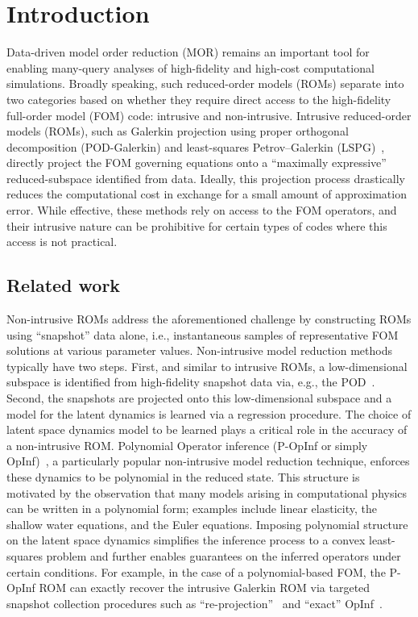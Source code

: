 \documentclass[3p,computermodern,11pt]{elsarticle}
\numberwithin{equation}{section}
\begin{document}
\section{Introduction}
Data-driven model order reduction (MOR) remains an important tool for enabling many-query analyses of high-fidelity and high-cost computational simulations. Broadly speaking, such reduced-order models (ROMs) separate into two categories based on whether they require direct access to the high-fidelity full-order model (FOM) code: intrusive and non-intrusive. Intrusive reduced-order models (ROMs), such as Galerkin projection using proper orthogonal decomposition (POD-Galerkin) and least-squares Petrov--Galerkin (LSPG)~\cite{CaBaAn17}, directly project the FOM governing equations onto a ``maximally expressive'' reduced-subspace identified from data. Ideally, this projection process drastically reduces the computational cost in exchange for a small amount of approximation error.  While effective, these methods rely on access to the FOM operators, and their intrusive nature can be prohibitive for certain types of codes where this access is not practical. 

\subsection{Related work}

Non-intrusive ROMs address the aforementioned challenge by constructing ROMs using  ``snapshot'' data alone, i.e., instantaneous samples of representative FOM solutions at various parameter values. Non-intrusive model reduction methods typically have two steps. First, and similar to intrusive ROMs, a low-dimensional subspace is identified from high-fidelity snapshot data via, e.g., the POD~\cite{BeHoLu93}. Second, the snapshots are projected onto this low-dimensional subspace and a model for the latent dynamics is learned via a regression procedure. The choice of latent space dynamics model to be learned plays a critical role in the accuracy of a non-intrusive ROM. Polynomial Operator inference (P-OpInf or simply OpInf)~\cite{PeWi16}, a particularly popular non-intrusive model reduction technique, enforces these dynamics to be polynomial in the reduced state. This structure is motivated by the observation that many models arising in computational physics can be written in a polynomial form; examples include linear elasticity, the shallow water equations, and the Euler equations. Imposing polynomial structure on the latent space dynamics simplifies the inference process to a convex least-squares problem and further enables guarantees on the inferred operators under certain conditions.  For example, in the case of a polynomial-based FOM, the P-OpInf ROM can exactly recover the intrusive Galerkin ROM via targeted snapshot collection procedures such as ``re-projection''~\cite{Pe20} and ``exact'' OpInf~\cite{RoSaSt25}. 
\end{document}
